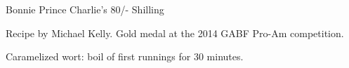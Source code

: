 \begin{recipe}{Bonnie Prince Charlie's 80/- Shilling}

\begin{aboutblock}
Recipe by Michael Kelly. Gold medal at the 2014 GABF Pro-Am competition.
\sourceaha
\end{aboutblock}


\begin{methodandtiming}

\begin{mashsteps}
\end{mashsteps}

\begin{fermentationsteps}
\end{fermentationsteps}

\begin{directions}
Caramelized wort: boil  of first runnings for 30 minutes.
\end{directions}

\end{methodandtiming}

\recipebreak

\begin{ingredientsblock}

\begin{malts}
\end{malts}

\begin{hops}
\end{hops}


\end{ingredientsblock}

\end{recipe}

